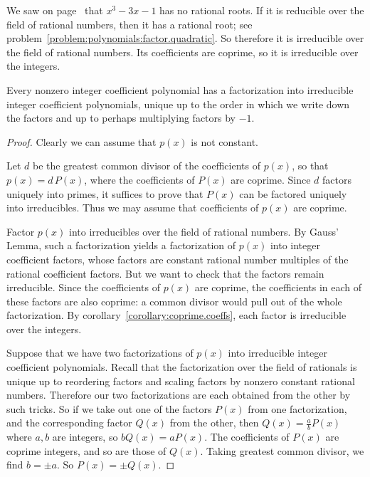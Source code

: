 \begin{example}
We saw on page~ that \(x^3-3x-1\) has no rational roots.
If it is reducible over the field of rational numbers, then it has a rational root; see problem~\vref{problem:polynomials:factor.quadratic}.
So therefore it is irreducible over the field of rational numbers.
Its coefficients are coprime, so it is irreducible over the integers.
\end{example}

\begin{theorem}
Every nonzero integer coefficient polynomial has a factorization into irreducible integer coefficient polynomials, unique up to the order in which we write down the factors and up to perhaps multiplying factors by \(-1\).
\end{theorem}
\begin{proof}
Clearly we can assume that \(p(x)\) is not constant.

Let \(d\) be the greatest common divisor of the coefficients of \(p(x)\), so that \(p(x) = d \, P(x)\), where the coefficients of \(P(x)\) are coprime. 
Since \(d\) factors uniquely into primes, it suffices to prove that
\(P(x)\) can be factored uniquely into irreducibles. 
Thus we may assume that coefficients of \(p(x)\) are coprime. 

Factor \(p(x)\) into irreducibles over the field of rational numbers.
By Gauss' Lemma, such a factorization yields a factorization of \(p(x)\) into integer coefficient factors, whose factors are constant rational number multiples of the rational coefficient factors. 
But we want to check that the factors remain irreducible.
Since the coefficients of \(p(x)\) are coprime, the coefficients in each of these factors are also coprime: a common divisor would pull out of the whole factorization.
By corollary~\vref{corollary:coprime.coeffs}, each factor is irreducible over the integers.

Suppose that we have two factorizations of \(p(x)\) into irreducible integer coefficient polynomials.
Recall that the factorization over the field of rationals is unique up to reordering factors and scaling factors by nonzero constant rational numbers.
Therefore our two factorizations are each obtained from the other by such tricks.
So if we take out one of the factors \(P(x)\) from one factorization, and the corresponding factor \(Q(x)\) from the other, then \(Q(x)=\frac{a}{b}P(x)\) where \(a, b\) are integers, so \(bQ(x)=aP(x)\).
The coefficients of \(P(x)\) are coprime integers, and so are those of \(Q(x)\).
Taking greatest common divisor, we find \(b = \pm a\).
So \(P(x)=\pm Q(x)\).
\end{proof}

